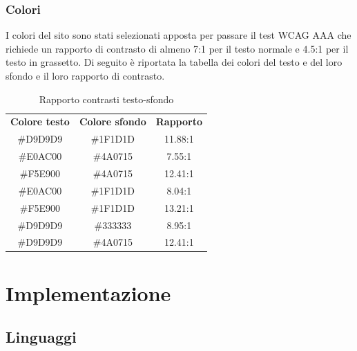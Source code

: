 \documentclass{article}
\begin{document}
			\subsubsection{Colori}
				I colori del sito sono stati selezionati apposta per passare il test WCAG AAA che richiede un rapporto di contrasto di almeno 7:1 per il testo normale e 4.5:1 per il testo in grassetto. Di seguito è riportata la tabella dei colori del testo e del loro sfondo e il loro rapporto di contrasto.
				\captionsetup[table]{name=Tabella}
				\setlength{\tabcolsep}{18pt}
				\renewcommand{\arraystretch}{1.5}
				\begin{table}[htp] %
					\begin{center}
						\caption {Rapporto contrasti testo-sfondo}
						 \normalsize\mdseries
						\begin{tabular}{ c c c }
							\rowcolor{custom}
							\bfseries\color{white} Colore testo & \bfseries\color{white} Colore sfondo & \bfseries\color{white} Rapporto \\
							\#D9D9D9 & \#1F1D1D & 11.88:1  \\ %
							\#E0AC00 & \#4A0715 & 7.55:1  \\ %
							\#F5E900 & \#4A0715 & 12.41:1  \\ %
							\#E0AC00 & \#1F1D1D & 8.04:1  \\ %
							\#F5E900 & \#1F1D1D & 13.21:1  \\ %
							\#D9D9D9 & \#333333 & 8.95:1  \\ %
							\#D9D9D9 & \#4A0715 & 12.41:1  \\ %
						\end{tabular}
					\end{center}
				\end{table}
	\section{Implementazione}
		
		\subsection{Linguaggi}
			
\end{document}

